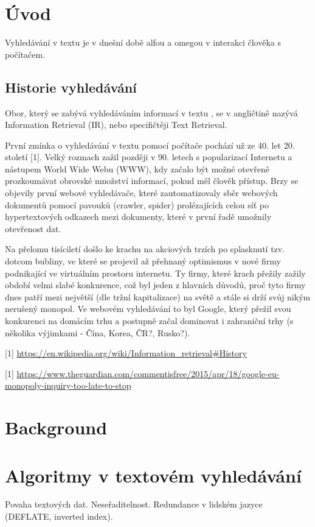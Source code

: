 \documentclass[11pt]{article}
\begin{document}
\section{Úvod}
Vyhledávání v textu je v dnešní době alfou a omegou v interakci člověka s
počítačem. 

\subsection{Historie vyhledávání}
Obor, který se zabývá vyhledáváním informací v textu , se v angličtině nazývá
Information Retrieval (IR), nebo specifičtěji Text Retrieval. 

První zmínka o vyhledávání v textu pomocí počítače pochází už ze 40. let 20.
století [1]. Velký rozmach zažil později v 90. letech s popularizací Internetu
a nástupem World Wide Webu (WWW), kdy začalo být možné otevřeně prozkoumávat
obrovské množství informací, pokud měl člověk přístup. Brzy se objevily první
webové vyhledávače, které zautomatizovaly sběr webových dokumentů pomocí
pavouků (crawler, spider) prolézajících celou síť po hypertextových odkazech
mezi dokumenty, které v první řadě umožnily otevřenost dat.

Na přelomu tisíciletí došlo ke krachu na akciových trzích po splasknutí tzv.
dotcom bubliny, ve které se projevil až přehnaný optimismus v nové firmy
podnikající ve virtuálním prostoru internetu. Ty firmy, které krach přežily
zažily období velmi slabé konkurence, což byl jeden z hlavních důvodů, proč
tyto firmy dnes patří mezi největší (dle tržní kapitalizace) na světě a stále
si drží svůj nikým nerušený monopol. Ve webovém vyhledávání to byl Google,
který přežil svou konkurenci na domácím trhu a postupně začal dominovat i
zahraniční trhy (s několika výjimkami - Čína, Korea, ČR?, Rusko?).


[1] \url{https://en.wikipedia.org/wiki/Information_retrieval#History}


[1] \url{https://www.theguardian.com/commentisfree/2015/apr/18/google-eu-monopoly-inquiry-too-late-to-stop}

\section{Background}

\section{Algoritmy v textovém vyhledávání}
Povaha textových dat. Neseřaditelnost. Redundance v lidském jazyce (DEFLATE, inverted index).
\end{document}
